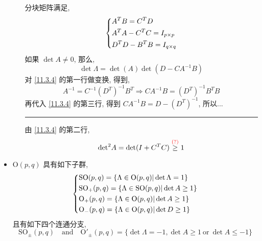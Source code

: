 \begin{itemize}
\begin{itemize}
		\begin{tcolorbox}[title=proof:]
			分块矩阵满足,
			\begin{equation} \label{11.3.4}
				\begin{dcases}
					A^T B = C^T D \\
					A^T A - C^T C = I_{p \times p} \\
					D^T D - B^T B = I_{q \times q}
				\end{dcases}
			\end{equation}
			如果 $\det A \neq 0$, 那么,
			\begin{equation}
				\det \Lambda = \det(A) \det(D - C A^{- 1} B)
			\end{equation}
			对 \eqref{11.3.4} 的第一行做变换, 得到,
			\begin{equation}
				A^{- 1} = C^{- 1} (D^T)^{- 1} B^T \Longrightarrow C A^{- 1} B = (D^T)^{- 1} B^T B
			\end{equation}
			再代入 \eqref{11.3.4} 的第三行, 得到 $C A^{- 1} B = D - (D^T)^{- 1}$, 所以...
			
			\noindent\rule[0.5ex]{\linewidth}{0.5pt} %
			
			由 \eqref{11.3.4} 的第二行,
			\begin{equation}
				{\det}^2 A = \det(I + C^T C) \overset{\textcolor{red}{(?)}}{\geq} 1
			\end{equation}
		\end{tcolorbox}
	\end{itemize}
	
	\item $\mathrm{O}(p, q)$ 具有如下子群,
	\begin{equation}
		\begin{dcases}
			\mathrm{SO}(p, q) = \{\Lambda \in \mathrm{O}(p, q) | \det \Lambda = 1\} \\
			\mathrm{SO}_+(p, q) = \{\Lambda \in \mathrm{SO}(p, q) | \det A \geq 1\} \\
			\mathrm{O}_+(p, q) = \{\Lambda \in \mathrm{O}(p, q) | \det A \geq 1\} \\
			\mathrm{O}_-(p, q) = \{\Lambda \in \mathrm{O}(p, q) | \det D \geq 1\}
		\end{dcases}
	\end{equation}
	且有如下四个连通分支,
	\begin{equation}
		\mathrm{SO}_\pm(p, q) \quad \text{and} \quad \mathrm{O'}_\pm(p, q) = \{\det \Lambda = - 1, \det A \geq 1 \ \text{or} \ \det A \leq - 1\}
	\end{equation}
\end{itemize}

